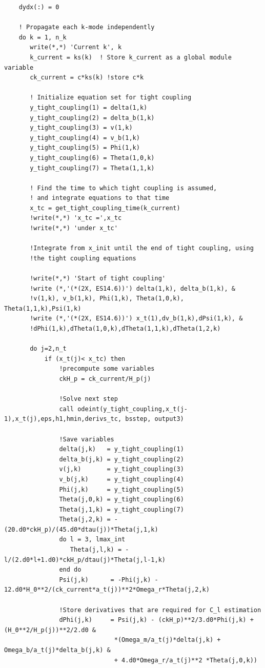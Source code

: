 \documentclass[a4paper]{report}
\begin{document}
\begin{verbatim}
    dydx(:) = 0

    ! Propagate each k-mode independently
    do k = 1, n_k
       write(*,*) 'Current k', k
       k_current = ks(k)  ! Store k_current as a global module variable
       ck_current = c*ks(k) !store c*k

       ! Initialize equation set for tight coupling
       y_tight_coupling(1) = delta(1,k)
       y_tight_coupling(2) = delta_b(1,k)
       y_tight_coupling(3) = v(1,k)
       y_tight_coupling(4) = v_b(1,k)
       y_tight_coupling(5) = Phi(1,k)
       y_tight_coupling(6) = Theta(1,0,k)
       y_tight_coupling(7) = Theta(1,1,k)
       
       ! Find the time to which tight coupling is assumed, 
       ! and integrate equations to that time
       x_tc = get_tight_coupling_time(k_current)
       !write(*,*) 'x_tc =',x_tc
       !write(*,*) 'under x_tc'

       !Integrate from x_init until the end of tight coupling, using
       !the tight coupling equations

       !write(*,*) 'Start of tight coupling'
       !write (*,'(*(2X, ES14.6))') delta(1,k), delta_b(1,k), &
       !v(1,k), v_b(1,k), Phi(1,k), Theta(1,0,k), Theta(1,1,k),Psi(1,k)
       !write (*,'(*(2X, ES14.6))') x_t(1),dv_b(1,k),dPsi(1,k), &
       !dPhi(1,k),dTheta(1,0,k),dTheta(1,1,k),dTheta(1,2,k)

       do j=2,n_t
           if (x_t(j)< x_tc) then 
               !precompute some variables
               ckH_p = ck_current/H_p(j)

               !Solve next step
               call odeint(y_tight_coupling,x_t(j-1),x_t(j),eps,h1,hmin,derivs_tc, bsstep, output3)

               !Save variables
               delta(j,k)   = y_tight_coupling(1)
               delta_b(j,k) = y_tight_coupling(2)
               v(j,k)       = y_tight_coupling(3)
               v_b(j,k)     = y_tight_coupling(4)
               Phi(j,k)     = y_tight_coupling(5)
               Theta(j,0,k) = y_tight_coupling(6)
               Theta(j,1,k) = y_tight_coupling(7)
               Theta(j,2,k) = -(20.d0*ckH_p)/(45.d0*dtau(j))*Theta(j,1,k)
               do l = 3, lmax_int
                  Theta(j,l,k) = -l/(2.d0*l+1.d0)*ckH_p/dtau(j)*Theta(j,l-1,k)
               end do	
               Psi(j,k)      = -Phi(j,k) - 12.d0*H_0**2/(ck_current*a_t(j))**2*Omega_r*Theta(j,2,k)

               !Store derivatives that are required for C_l estimation
               dPhi(j,k)     = Psi(j,k) - (ckH_p)**2/3.d0*Phi(j,k) + (H_0**2/H_p(j))**2/2.d0 &
                              *(Omega_m/a_t(j)*delta(j,k) + Omega_b/a_t(j)*delta_b(j,k) &
                              + 4.d0*Omega_r/a_t(j)**2 *Theta(j,0,k))


\end{verbatim}
\end{document}
